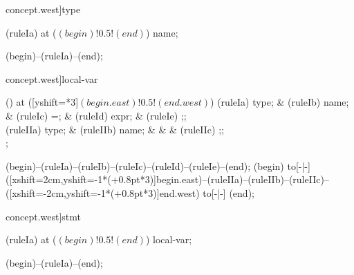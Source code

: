 \begin{syntax}[[xshift=22mm]concept.west]{type}
  
  \node[terminal] (ruleIa) at ($(begin)!0.5!(end)$) {name};
  
  \draw[path] (begin)--(ruleIa)--(end);
\end{syntax}
\begin{syntax}[[xshift=22mm]concept.west]{local-var}
  
  \node[sequence,anchor=north] () at ([yshift=\syntaxrulenodeheight-0.8pt*3]$(begin.east)!0.5!(end.west)$) {
    \node[nonterminal] (ruleIa) {type};
    &
    \node[terminal]    (ruleIb) {name};
    &
    \node[terminal]    (ruleIc) {=};
    &
    \node[nonterminal] (ruleId) {expr};
    &
    \node[terminal]    (ruleIe) {;};
    \\
    \node[nonterminal] (ruleIIa) {type};
    &
    \node[terminal]    (ruleIIb) {name};
    &
    &
    &
    \node[terminal]    (ruleIIc) {;};
    \\
  };
  
  
  
  \draw[path] (begin)--(ruleIa)--(ruleIb)--(ruleIc)--(ruleId)--(ruleIe)--(end);
  \draw[path] (begin) to[-|-] ([xshift=2cm,yshift=-1*(\syntaxruledist+0.8pt*3)]begin.east)--(ruleIIa)--(ruleIIb)--(ruleIIc)--([xshift=-2cm,yshift=-1*(\syntaxruledist+0.8pt*3)]end.west) to[-|-] (end);
\end{syntax}
\begin{syntax}[[xshift=22mm]concept.west]{stmt}
  
  \node[nonterminal] (ruleIa) at ($(begin)!0.5!(end)$) {local-var};
  
  \draw[path] (begin)--(ruleIa)--(end);
\end{syntax}

